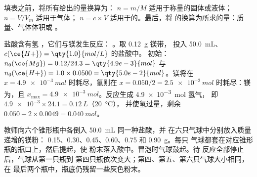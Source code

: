\begin{method}[初始状态的物质的量]\label{met:g10:reaction-progress-table:amounts}
填表之前，将所有给出的量换算为：
$n = m/M$ 适用于称量的固体或液体；$n = V/V_m$ 适用于气体；
$n = c \times V$ 适用于的。最后，将
的换算为所求的量：质量、气体体积或
。
\end{method}

\begin{example}[盐酸中的镁]\label{ex:g10:reaction-progress-table:magnesium}
盐酸含有氢 ，它们与镁发生反应：
。取 \qty{0.12}{g} 镁带，
投入 \qty{50.0}{mL}、$c(\ce{H+}) = \qty{1.0}{mol/L}$ 的盐酸中。
初始：$n_0(\ce{Mg}) = 0.12/24.3 = \qty{4.9e-3}{mol}$ 与
$n_0(\ce{H+}) = 1.0 \times 0.0500 = \qty{5.0e-2}{mol}$。镁将在
$x = \qty{4.9e-3}{mol}$ 时耗尽，氢则在
$x = 0.050/2 = \qty{2.5e-2}{mol}$ 时耗尽：镁为，且
$x_{\max} = \qty{4.9e-3}{mol}$。反应生成 \qty{4.9e-3}{mol} 氢气，
即 $\num{4.9e-3} \times 24.1 = \qty{0.12}{L}$（\qty{20}{\celsius}），
并使氢过量，剩余 $0.050 - 2 \times 0.0049 =
\qty{0.040}{mol}$。
\end{example}

\begin{inthelab}[锥形瓶上的气球]
教师向六个锥形瓶中各倒入 \qty{50.0}{mL} 同一种盐酸，并
在六只气球中分别放入质量递增的镁粉：
0.15、0.30、0.45、0.60、0.75 和 \qty{0.90}{g}。每只
气球都套在对应锥形瓶的瓶口上，然后提起，使
粉末落入酸中。冒泡时气球鼓起。待
反应全部停止后，气球从第一只瓶到
第四只瓶依次变大；第四、第五、第六只气球大小相同，在
最后两个瓶中，瓶底仍残留一些灰色粉末。
\end{inthelab}

